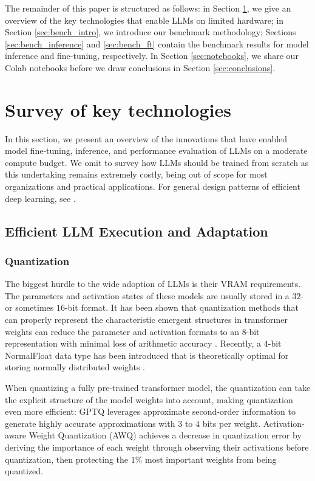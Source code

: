 \documentclass[conference]{IEEEtran}
\begin{document}
The remainder of this paper is structured as follows: in Section \ref{sec:ow}, we give an overview of the key technologies that enable LLMs on limited hardware; in Section \ref{sec:bench_intro}, we introduce our benchmark methodology; Sections \ref{sec:bench_inference} and \ref{sec:bench_ft} contain the benchmark results for model inference and fine-tuning, respectively. In Section \ref{sec:notebooks}, we share our Colab notebooks before we draw conclusions in Section \ref{sec:conclusions}.



\section{Survey of key technologies}
\label{sec:ow}
In this section, we present an overview of the innovations that have enabled model fine-tuning, inference, and performance evaluation of LLMs on a moderate compute budget. We omit to survey how LLMs should be trained from scratch as this undertaking remains extremely costly, being out of scope for most organizations and practical applications. For general design patterns of efficient deep learning, see \cite{menghani2023efficient, tuggener2020design}.

\subsection{Efficient LLM Execution and Adaptation}
\subsubsection{Quantization}
\label{sec:quant}
The biggest hurdle to the wide adoption of LLMs is their VRAM requirements. The parameters and activation states of these models are usually stored in a $32$- or sometimes $16$-bit format. It has been shown that quantization methods that can properly represent the characteristic emergent structures in transformer \cite{vaswani_attention_2017} weights can reduce the parameter and activation formats to an $8$-bit representation with minimal loss of arithmetic accuracy \cite{bnb}. Recently, a $4$-bit NormalFloat data type has been introduced that is theoretically optimal for storing normally distributed weights \cite{qlora}.

When quantizing a fully pre-trained transformer model, the quantization can take the explicit structure of the model weights into account, making quantization even more efficient: GPTQ \cite{gptq} leverages approximate second-order information to generate highly accurate approximations with $3$ to $4$ bits per weight. Activation-aware Weight Quantization (AWQ) \cite{awq} achieves a decrease in quantization error by deriving the importance of each weight through observing their activations before quantization, then protecting the $1\%$ most important weights from being quantized. 
\end{document}

